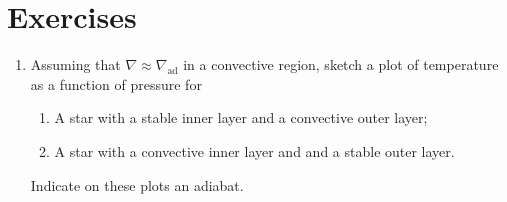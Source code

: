 \section{Exercises}
\begin{enumerate}
\item Assuming that $\nabla \approx \nabla_{\mathrm{ad}}$ in a convective region, sketch a plot of temperature as a function of pressure for
\begin{enumerate}
\item A star with a stable inner layer and a convective outer layer;
\item A star with a convective inner layer and and a stable outer layer.
\end{enumerate}
Indicate on these plots an adiabat.
\end{enumerate}